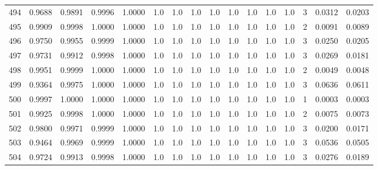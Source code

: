 \begin{tabular}{lrrrrrrrrrrrrrrr}
494 &      0.9688 &  0.9891 &  0.9996 &  1.0000 &     1.0 &     1.0 &     1.0 &     1.0 &     1.0 &     1.0 &      1.0 &        1.0 &      3 &                    0.0312 &                     0.0203 \\
495 &      0.9909 &  0.9998 &  1.0000 &  1.0000 &     1.0 &     1.0 &     1.0 &     1.0 &     1.0 &     1.0 &      1.0 &        1.0 &      2 &                    0.0091 &                     0.0089 \\
496 &      0.9750 &  0.9955 &  0.9999 &  1.0000 &     1.0 &     1.0 &     1.0 &     1.0 &     1.0 &     1.0 &      1.0 &        1.0 &      3 &                    0.0250 &                     0.0205 \\
497 &      0.9731 &  0.9912 &  0.9998 &  1.0000 &     1.0 &     1.0 &     1.0 &     1.0 &     1.0 &     1.0 &      1.0 &        1.0 &      3 &                    0.0269 &                     0.0181 \\
498 &      0.9951 &  0.9999 &  1.0000 &  1.0000 &     1.0 &     1.0 &     1.0 &     1.0 &     1.0 &     1.0 &      1.0 &        1.0 &      2 &                    0.0049 &                     0.0048 \\
499 &      0.9364 &  0.9975 &  1.0000 &  1.0000 &     1.0 &     1.0 &     1.0 &     1.0 &     1.0 &     1.0 &      1.0 &        1.0 &      3 &                    0.0636 &                     0.0611 \\
500 &      0.9997 &  1.0000 &  1.0000 &  1.0000 &     1.0 &     1.0 &     1.0 &     1.0 &     1.0 &     1.0 &      1.0 &        1.0 &      1 &                    0.0003 &                     0.0003 \\
501 &      0.9925 &  0.9998 &  1.0000 &  1.0000 &     1.0 &     1.0 &     1.0 &     1.0 &     1.0 &     1.0 &      1.0 &        1.0 &      2 &                    0.0075 &                     0.0073 \\
502 &      0.9800 &  0.9971 &  0.9999 &  1.0000 &     1.0 &     1.0 &     1.0 &     1.0 &     1.0 &     1.0 &      1.0 &        1.0 &      3 &                    0.0200 &                     0.0171 \\
503 &      0.9464 &  0.9969 &  0.9999 &  1.0000 &     1.0 &     1.0 &     1.0 &     1.0 &     1.0 &     1.0 &      1.0 &        1.0 &      3 &                    0.0536 &                     0.0505 \\
504 &      0.9724 &  0.9913 &  0.9998 &  1.0000 &     1.0 &     1.0 &     1.0 &     1.0 &     1.0 &     1.0 &      1.0 &        1.0 &      3 &                    0.0276 &                     0.0189 \\

\end{tabular}
